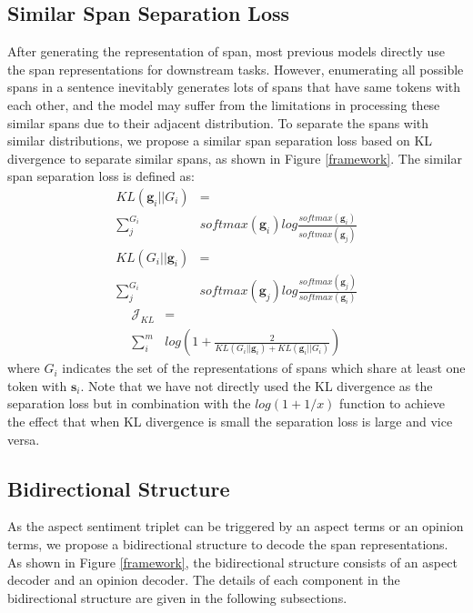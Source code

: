 \documentclass[11pt]{article}
\begin{document}
\subsection{Similar Span Separation Loss}
After generating the representation of span, most previous models directly use the span representations for downstream tasks. However, enumerating all possible spans in a sentence inevitably generates lots of spans that have same tokens with each other, and the model may suffer from the limitations in processing these similar spans due to their adjacent distribution. To separate the spans with similar distributions, we propose a similar span separation loss based on KL divergence to separate similar spans, as shown in Figure \ref{framework}. The similar span separation loss is defined as:
\begin{equation}
	\begin{split}
		KL(\mathbf{g}_{i}||G_{i}) &= \\ \sum_{j}^{G_{i}}&softmax(\mathbf{g}_{i}) log \frac{softmax(\mathbf{g}_{i})}{softmax(\mathbf{g}_{j})}
	\end{split}
\end{equation}
\begin{equation}
	\begin{split}
		KL(G_{i}||\mathbf{g}_{i}) &= \\ \sum_{j}^{G_{i}} &softmax(\mathbf{g}_{j}) log \frac{softmax(\mathbf{g}_{j})}{softmax(\mathbf{g}_{i})}
	\end{split}
\end{equation}
\begin{equation}
	\begin{split}
		\mathcal{J}_{KL} &= \\ \sum_{i}^{m} &log(1 + \frac{2}{KL(G_{i}||\mathbf{g}_{i}) + KL(\mathbf{g}_{i}||G_{i})})
	\end{split}
\end{equation}
where $G_{i}$ indicates the set of the representations of spans which share at least one token with $\mathbf{s}_{i}$. Note that we have not directly used the KL divergence as the separation loss but in combination with the $log(1+1/x)$ function to achieve the effect that when KL divergence is small the separation loss is large and vice versa.


\subsection{Bidirectional Structure} \label{BCS}
As the aspect sentiment triplet can be triggered by an aspect terms or an opinion terms, we propose a bidirectional structure to decode the span representations. As shown in Figure \ref{framework}, the bidirectional structure consists of an aspect decoder and an opinion decoder. The details of each component in the bidirectional structure are given in the following subsections.
\end{document}
